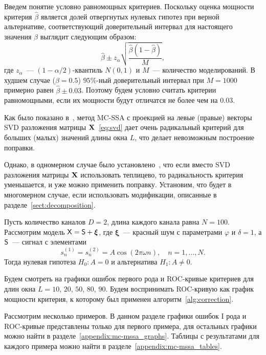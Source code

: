 \documentclass[specialist,
substylefile = spbu_report.rtx,
subf,href,colorlinks=true, 12pt]{disser}
\theoremstyle{definition}
\newcommand{\bfxi}{\boldsymbol{\xi}}
\begin{document}
Введем понятие условно равномощных критериев. Поскольку оценка мощности критерия $\hat \beta$ является долей отвергнутых нулевых гипотез при верной альтернативе, соответствующий доверительный интервал для настоящего значения $\beta$ выглядит следующим образом:
\[
	\hat \beta \pm z_\alpha \sqrt{\frac{\hat \beta(1 - \hat \beta)}M},
\]
где $z_\alpha$~--- $(1-\alpha/2)$-квантиль $N(0, 1)$ и $M$~--- количество моделирований. В худшем случае ($\beta=0.5$) $95\%$-ный доверительный интервал при $M=1000$ примерно равен $\hat\beta \pm 0.03$. Поэтому будем условно считать критерии равномощными, если их мощности будут отличатся не более чем на $0.03$.

Как было показано в~\cite[Приложение  Б.2.4]{Larin_2022}, метод MC-SSA с проекцией на левые (правые) векторы SVD разложения матрицы $\mathbf{X}$~\eqref{eq:svd} дает очень радикальный критерий для больших (малых) значений длины окна $L$, что делает невозможным построение поправки.

Однако, в одномерном случае было установлено~\cite{Larin_2022}, что если вместо SVD разложения матрицы $\mathbf{X}$ использовать теплицево, то радикальность критерия уменьшается, и уже можно применить поправку. Установим, что будет в многомерном случае, если использовать модификации, описанные в разделе~\ref{sect:decomposition}.

Пусть количество каналов $D=2$, длина каждого канала равна $N=100$. Рассмотрим модель $\tX=\tS+\bfxi$, где $\bfxi$~--- красный шум с параметрами $\varphi$ и $\delta=1$, а $\mathsf{S}$~--- сигнал с элементами
\[
s_n^{(1)}=s_n^{(2)}=A\cos(2\pi\omega n),\quad n=1,\ldots, N.
\]
Тогда нулевая гипотеза $H_0:A=0$ и альтернатива $H_1:A\ne0$.

Будем смотреть на графики ошибок первого рода и ROC-кривые критериев для длин окна $L=10$, $20$, $50$, $80$, $90$. Будем воспринимать ROC-кривую как график мощности критерия, к которому был применен алгоритм~\ref{alg:correction}.

Рассмотрим несколько примеров. В данном разделе графики ошибок I рода и ROC-кривые представлены только для первого примера, для остальных графики можно найти в разделе~\ref{appendix:mc-mssa_graphs}. Таблицы с результатами для каждого примера можно найти в разделе~\ref{appendix:mc-mssa_tables}.
\end{document}
